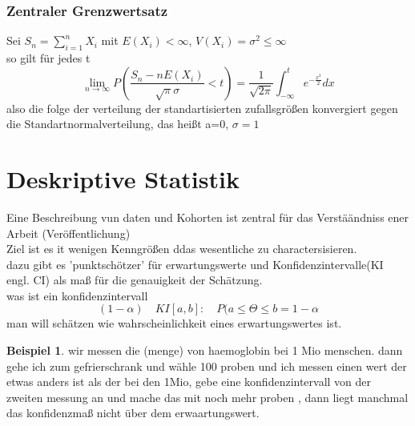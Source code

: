 \documentclass[a4paper]{article}
\theoremstyle{definition}
\newtheorem{beispiel}{Beispiel}
\theoremstyle{remark}
\begin{document}
\subsubsection{Zentraler Grenzwertsatz}
\label{ssub:zentraler_grenzwertsatz}

Sei $ S_n =\sum_{i=1}^{n}X_i$ mit $ E(X_i)< \infty$, $V(X_i)=\sigma ^2 \leq \infty$\\
so gilt für jedes t 
\begin{equation}
  \lim_{n\rightarrow \infty}P(\frac{S_n-nE(X_i)}{\sqrt{\pi}\sigma }<t)= \frac{1}{\sqrt{2\pi}}\int_{-\infty}^t e^{-\frac{x^2}{2}}dx
\end{equation}
also die folge der verteilung der standartisierten zufallsgrößen konvergiert gegen die Standartnormalverteilung, das heißt a=0, $\sigma =1$ 

\section{Deskriptive Statistik}
\label{sec:deskriptive_statistik}
Eine Beschreibung vun daten und Kohorten ist zentral für das Verstäändniss ener Arbeit (Veröffentlichung)\\
Ziel ist es it wenigen Kenngrößen ddas wesentliche zu charactersisieren.\\
dazu gibt es 'punktschötzer' für erwartungswerte und Konfidenzintervalle(KI engl. CI) als maß für die genauigkeit der Schätzung.\\
was ist ein konfidenzintervall\:
\begin{equation}
  (1-\alpha )\quad KI[a,b]: \quad P(a\leq\Theta\leq b = 1-\alpha 
\end{equation}
man will schätzen wie wahrscheinlichkeit eines erwartungswertes ist.
\begin{beispiel}
  wir messen die (menge) von haemoglobin bei 1 Mio menschen. dann gehe ich zum gefrierschrank und wähle 100 proben und ich messen einen wert der etwas anders ist als der bei den 1Mio, gebe eine konfidenzintervall von der zweiten messung an und mache das mit noch mehr proben , dann liegt manchmal das konfidenzmaß nicht über dem erwaartungswert.
\end{beispiel}
\end{document}
